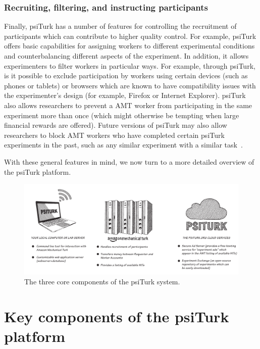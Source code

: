 \documentclass[twocolumn]{svjour3}          %
\newcommand{\psiturk}[0]{\textsf{psiTurk}}
\begin{document}
\subsubsection{Recruiting, filtering, and instructing participants}
Finally, \psiturk{} has a number of features for controlling the recruitment
of participants which can contribute to higher quality control.
For example, \psiturk{} offers basic capabilities for assigning workers to different experimental conditions 
and counterbalancing different aspects of the experiment.
In addition, it allows experimenters to filter workers in particular ways.  For example, through \psiturk{},
is it possible to exclude participation by workers using certain devices (such as phones or tablets) or browsers
which are known to have compatibility issues with the experimenter's design (for example,
Firefox or Internet Explorer).  \psiturk{} also allows researchers to prevent a AMT worker from 
participating in the same experiment more than once (which might otherwise be tempting when
large financial rewards are offered).  Future versions of \psiturk{} may also allow researchers to 
block AMT workers who have completed certain \psiturk{} experiments in the past, such as
any similar experiment with a similar task~\citep[see][for a discussion about non-naivety amongst AMT workers]{chandler2014nonnaivete}.


With these general features in mind, we now turn to a more detailed overview of the 
\psiturk{} platform.

\begin{figure}[tp]
\centering
\includegraphics[scale=.40]{figures/psiturk-components.pdf}
\caption{The three core components of the \psiturk{} system.  }
\label{fig:components}
\end{figure}


\section{Key components of the \psiturk{} platform}
\end{document}
